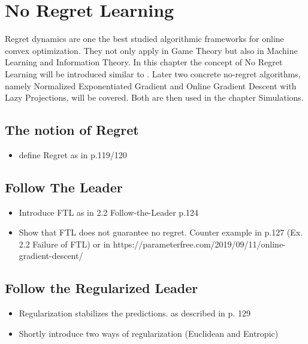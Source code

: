 
\chapter{No Regret Learning}\label{chapter:noRegretLearning}

Regret dynamics are one the best studied algorithmic frameworks for online convex optimization. They not only apply in Game Theory but also in Machine Learning and Information Theory. In this chapter the concept of No Regret Learning will be introduced similar to \cite[Chapter 2 Online Convex Optimization]{shalev}. Later two concrete no-regret algorithms, namely Normalized Exponentiated Gradient and  Online Gradient Descent with Lazy Projections, will be covered. Both are then used in the chapter Simulations.

\section{The notion of Regret}\label{section:theNotionOfRegret}

\begin{itemize}
    \item define Regret as in \cite{shalev} p.119/120
\end{itemize}

\section{Follow The Leader}\label{section:followTheLeader}

\begin{itemize}
    \item Introduce FTL as in \cite{shalev} 2.2 Follow-the-Leader p.124
    \item Show that FTL does not guarantee no regret. Counter example in \cite{shalev} p.127 (Ex. 2.2 Failure of FTL) or in https://parameterfree.com/2019/09/11/online-gradient-descent/ 
\end{itemize}

\section{Follow the Regularized Leader}

\begin{itemize}
    \item Regularization stabilizes the predictions. as described in 
    \cite{shalev} p. 129
    \item Shortly introduce two ways of regularization (Euclidean and Entropic)
\end{itemize}

